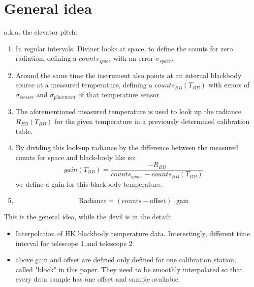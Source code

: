 \section{General idea}
a.k.a. the elevator pitch:

\begin{enumerate}
\item In regular intervals, Diviner looks at space, to define the counts for zero radiation, defining a $counts_{space}$ with an error $\sigma_{space}$. 
\item Around the same time the instrument also points at an internal blackbody source at a measured temperature, defining a $counts_{BB}\left(T_{BB}\right)$ with errors of $\sigma_{sensor}$ and $\sigma_{placement}$ of that temperature sensor.
\item The aforementioned measured temperature is used to look up the radiance $R_{BB}\left(T_{BB}\right)$ for the given temperature in a previously determined calibration table.
\item By dividing this look-up radiance by the difference between the measured counts for space and black-body like so: $$ gain\left(T_{BB}\right) = \frac{-R_{BB}}{counts_{space} - counts_{BB}\left(T_{BB}\right)} $$ we define a gain for this blackbody temperature.
\item $$ \mathrm{Radiance} = \left(\mathrm{counts} - \mathrm{offset}\right) \cdot \mathrm{gain} $$
\end{enumerate}

This is the general idea, while the devil is in the detail:
\begin{itemize}
\item Interpolation of HK blackbody temperature data. Interestingly, different time interval for telescope 1 and telescope 2.
\item above gain and offset are defined only defined for one calibration station, called "block" in this paper. They need to be smoothly interpolated so that every data sample has one offset and sample available.
\end{itemize}